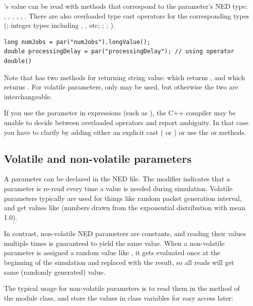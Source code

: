 's value can be read with methods that correspond to
the parameter's NED type: , ,
, , ,
.
There are also overloaded type cast operators for the corresponding types
(; integer types including , , etc;
; ; ).

\begin{verbatim}
long numJobs = par("numJobs").longValue();
double processingDelay = par("processingDelay"); // using operator double()
\end{verbatim}

Note that  has two methods for returning string value:
 which returns , and
 which returns .
For volatile parameters, only  may be used,
but otherwise the two are interchangeable.

If you use the  parameter in expressions (such as
), the C++ compiler may be unable to decide
between overloaded operators and report ambiguity. In that case
you have to clarify by adding either an explicit cast
( or ) or use
the  or  methods.


\subsection{Volatile and non-volatile parameters}

A parameter can be declared  in the NED file. The 
modifier indicates that a parameter is re-read every time a value is needed
during simulation. Volatile parameters typically are used for things like
random packet generation interval, and get values like 
(numbers drawn from the exponential distribution with mean 1.0).

In contrast, non-volatile NED parameters are constants, and reading their
values multiple times is guaranteed to yield the same value. When a non-volatile
parameter is assigned a random value like , it gets
evaluated once at the beginning of the simulation and replaced with the result,
so all reads will get same (randomly generated) value.

The typical usage for non-volatile parameters is to read them in the
 method of the module class, and store the values
in class variables for easy access later:

